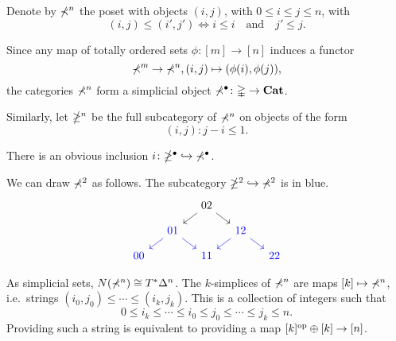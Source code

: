 \documentclass[main.tex]{subfiles}
\begin{document}
\begin{definition}
  \label{def:poset_for_asd}
  Denote by $\mathbb{\Sigma}^{n}$ the poset with objects $(i, j)$, with $0 \leq i \leq j \leq n$, with
  \begin{equation*}
    (i, j) \leq (i', j') \iff i \leq i \quad \text{and} \quad j' \leq j.
  \end{equation*}
\end{definition}

Since any map of totally ordered sets $\phi\colon [m] \to [n]$ induces a functor
\begin{equation*}
  \mathbb{\Sigma}^{m} \to \mathbb{\Sigma}^{n}, (i, j) \mapsto (\phi(i), \phi(j)),
\end{equation*}
the categories $\mathbb{\Sigma}^{n}$ form a simplicial object $\mathbb{\Sigma}^{\bullet}\colon \mathbb{\Delta} \to \mathbf{Cat}$.

Similarly, let $\mathbb{\Lambda}^{n}$ be the full subcategory of $\mathbb{\Sigma}^{n}$ on objects of the form
\begin{equation*}
  (i, j)\colon j - i \leq 1.
\end{equation*}

There is an obvious inclusion $i\colon \mathbb{\Lambda}^{\bullet} \hookrightarrow \mathbb{\Sigma}^{\bullet}$.

\begin{example}
  We can draw $\mathbb{\Sigma}^{2}$ as follows. The subcategory $\mathbb{\Lambda}^{2} \hookrightarrow \mathbb{\Sigma}^{2}$ is in blue.
  \begin{equation*}
    \begin{tikzcd}[column sep=small, row sep=small]
      && 02
      \arrow[dl]
      \arrow[dr]
      \\
      & \color{blue}{01}
      \arrow[dl, blue]
      \arrow[dr, blue]
      && \color{blue}{12}
      \arrow[dl, blue]
      \arrow[dr, blue]
      \\
      \color{blue}{00}
      && \color{blue}{11}
      && \color{blue}{22}
    \end{tikzcd}
  \end{equation*}
\end{example}

As simplicial sets, $N(\mathbb{\Sigma}^{n}) \cong T^{*} \Delta^{n}$. The $k$-simplices of $\mathbb{\Sigma}^{n}$ are maps $[k] \mapsto \mathbb{\Sigma}^{n}$, i.e.\ strings $(i_{0}, j_{0}) \leq \cdots \leq (i_{k}, j_{k})$. This is a collection of integers such that
\begin{equation*}
  0 \leq i_{k} \leq \cdots \leq i_{0} \leq j_{0} \leq \cdots \leq j_{k} \leq n.
\end{equation*}
Providing such a string is equivalent to providing a map $[k]^{\mathrm{op}} \oplus [k] \to [n]$.
\end{document}
